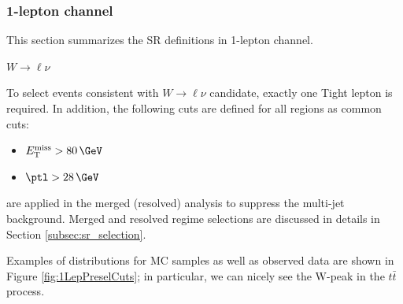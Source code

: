 \clearpage
\subsubsection{1-lepton channel}
\label{subsubsec:1lep_event_selection}
This section summarizes the SR definitions in 1-lepton channel.

\textbf{$W \to \ell\nu$}

To select events consistent with $W \to \ell\nu$ candidate, exactly one Tight lepton is required. In addition,
the following cuts are defined for all regions as common cuts:

\begin{itemize}
\item $\met > 80 \,\GeV$
\item $\ptl > 28 \,\GeV$ %
\end{itemize}
are applied in the merged (resolved) analysis to suppress the multi-jet background.
Merged and resolved regime selections are discussed in details in Section \ref{subsec:sr_selection}.

Examples of distributions for MC samples as well as observed data are shown in Figure \ref{fig:1LepPreselCuts}; in particular, we can nicely see the W-peak in the $t\bar{t}$ process.


